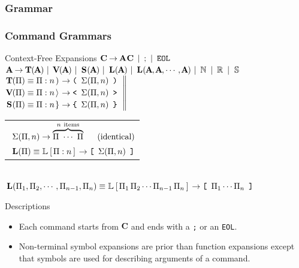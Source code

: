 \documentclass[10pt]{beamer}
\begin{document}
\subsubsection{Grammar}

\begin{frame}[t] \frametitle{Command Grammars}

	\begin{block}{Context-Free Expansions}
		$\left.\CMD \EXP \ARG \CMD \SEP \,\text{;}\, \SEP \,\texttt{EOL} \right.$ \\ [.24em]
		$\left.\ARG \EXP \TUP(\ARG) \SEP \VCT(\ARG) \SEP \SET(\ARG) \SEP
		 \LST(\ARG) \SEP \LST(\ARG, \ARG, \cdots, \ARG) \SEP \MSN \SEP \MSR \SEP \MSS \right.$ \\ [.27em]
		$\left.\text{%
		\begin{tabular}{@{}l}%
			$\TUP(\Pi) \EQV \Tup{\Pi}{n} \EXP \texttt{\TupBrkL}     \ \, \Sigma(\Pi, n) \ \, \texttt{\TupBrkR}$ \\ [.24em]
			$\VCT(\Pi) \EQV \Vct{\Pi}{n} \EXP \texttt{\VctBrkTextL} \ \, \Sigma(\Pi, n) \ \, \texttt{\VctBrkTextR}$ \\ [.24em]
			$\SET(\Pi) \EQV \Set{\Pi}{n} \EXP \texttt{\SetBrkL}     \ \, \Sigma(\Pi, n) \ \, \texttt{\SetBrkR}$
		\end{tabular}} \right\|\kern.128em$%
		\begin{tabular}{@{}l}%
			$\ \Sigma(\Pi, n) \rightarrow \overbrace{\Pi \ \cdots \ \Pi}^{n \ \text{items}} \quad\,\ \text{(identical)}$ \\ [.43em]
			$\ \LST(\Pi) \EQV \Lst{\Pi}{n} \EXP \texttt{\LstBrkL} \ \, \Sigma(\Pi, n) \ \, \texttt{\LstBrkR}$
		\end{tabular} \\ [.24em]
		$\left.\LST(\Pi_1,\Pi_2,\cdots,\Pi_{n-1},\Pi_n) \EQV \LstFull{\Pi_1\,\Pi_2\cdots\Pi_{n-1}\,\Pi_n} \EXP
		 \texttt{\LstBrkL} \ \, \Pi_1\cdots\Pi_n \ \, \texttt{\LstBrkR}\right.$
	\end{block}

	\begin{block}{Descriptions}
		\begin{itemize}
			\item Each command starts from $\CMD$ and ends with a \texttt{;} or an \texttt{EOL}.
			\item Non-terminal symbol expansions are prior than function expansions except that symbols are used for describing arguments of a command.
		\end{itemize}
	\end{block}

\end{frame}
\end{document}

